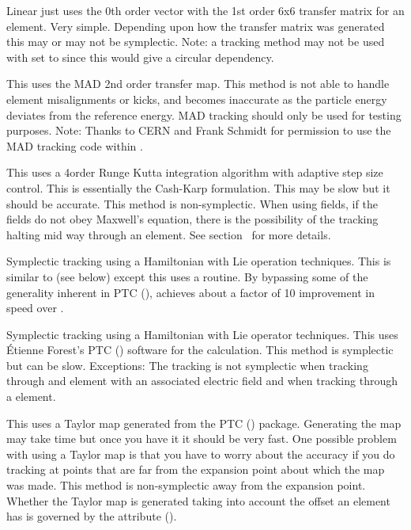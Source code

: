 \begin{description}
\item[\vn{Linear}]
Linear just uses the 0th order vector with the 1st order 6x6 transfer matrix for an element. Very
simple. Depending upon how the transfer matrix was generated this may or may not be
symplectic. Note: a  tracking method may not be used with  set to
 since this would give a circular dependency.

\item[\vn{MAD}]
This uses the MAD 2nd order transfer map. This method is not able to handle element misalignments or
kicks, and becomes inaccurate as the particle energy deviates from the reference energy. MAD
tracking should only be used for testing purposes. Note: Thanks to CERN and Frank Schmidt for
permission to use the MAD tracking code within \bmad.

\item[\vn{runge_kutta}]
This uses a 4\Th order Runge Kutta integration algorithm with adaptive step size control.  This is
essentially the Cash-Karp formulation. This may be slow but it should be accurate. This method is
non-symplectic.  When using  fields, if the fields do not obey Maxwell's
equation, there is the possibility of the  tracking halting mid way through an
element. See section~ for more details.

\item[\vn{Symp_Lie_Bmad}]
Symplectic tracking using a Hamiltonian with Lie operation techniques.  This is similar to
 (see below) except this uses a \bmad routine. By bypassing some of the generality
inherent in PTC (),  achieves about a factor of 10 improvement
in speed over .

\item[\vn{Symp_Lie_PTC}]
Symplectic tracking using a Hamiltonian with Lie operator techniques.  This uses \'Etienne Forest's
PTC () software for the calculation. This method is symplectic but can be
slow. Exceptions: The tracking is not symplectic when tracking through and element with an
associated electric field and when tracking through a  element.

\item[\vn{Taylor}]
This uses a Taylor map generated from the PTC () package. Generating the map may
take time but once you have it it should be very fast. One possible problem with using a Taylor map
is that you have to worry about the accuracy if you do tracking at points that are far from the
expansion point about which the map was made. This method is non-symplectic away from the expansion
point. Whether the Taylor map is generated taking into account the offset an element has is governed
by the  attribute ().


\end{description}
